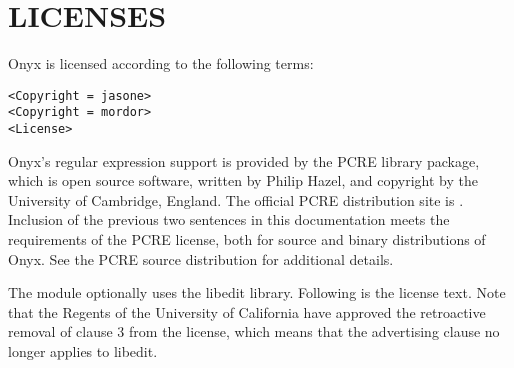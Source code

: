 %
%
%
%
%

\clearemptydoublepage
\backmatter
\chapter{LICENSES}
%
%

Onyx is licensed according to the following terms:

\begin{verbatim}
<Copyright = jasone>
<Copyright = mordor>
<License>
\end{verbatim}

Onyx's regular expression support is provided by the PCRE library package, which
is open source software, written by Philip Hazel, and copyright by the
University of Cambridge, England.  The official PCRE distribution site is
.  Inclusion of
the previous two sentences in this documentation meets the requirements of the
PCRE license, both for source and binary distributions of Onyx.  See the PCRE
source distribution for additional details.

The  module optionally uses the libedit library.  Following
is the license text.  Note that the Regents of the University of California have
approved the retroactive removal of clause 3 from the license, which means that
the advertising clause no longer applies to libedit.

